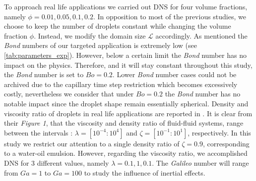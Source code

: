 To approach real life applications we carried out DNS for four volume fractions, namely $\phi = 0.01,0.05,0.1,0.2$.
In opposition to most of the previous studies, we choose to keep the number of droplets constant while changing the volume fraction $\phi$. 
Instead, we modify the domain size $\mathcal{L}$ accordingly. 
As mentioned the \textit{Bond} numbers of our targeted application is extremely low (see \ref{tab:parameters_exp}).
However, below a certain limit the \textit{Bond} number has no impact on the physics. 
Therefore, and it will stay constant throughout this study, the \textit{Bond} number is set to $Bo = 0.2$.
Lower \textit{Bond} number cases could not be archived due to the capillary time step restriction which becomes excessively costly, nevertheless we consider that under $Bo = 0.2$ the \textit{Bond} number has no notable impact since the droplet shape remain essentially spherical. 
Density and viscosity ratio of droplets in real life applications are reported in \citet[Figure 1.]{balla2020effect}.
It is clear from their \textit{Figure 1}, that the viscosity and density ratio of fluid-fluid systems, range between the intervals : $\lambda = [10^{-4} : 10^4]$ and $\zeta = [10^{-1} : 10^1]$, respectively. 
In this study we restrict our attention to a single density ratio of $\zeta = 0.9$, corresponding to a water-oil emulsion.
However, regarding the viscosity ratio, we accomplished DNS for 3 different values, namely $\lambda = 0.1,1,0.1$.
The \textit{Galileo} number will range from $Ga = 1$ to $Ga = 100$ to study the influence of inertial effects.

